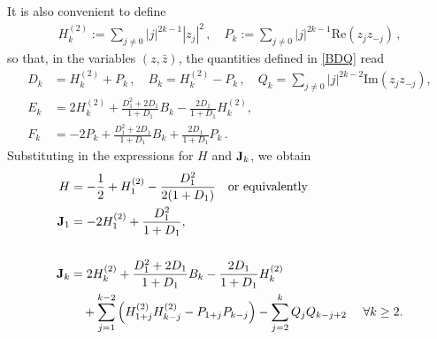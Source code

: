 \documentclass[reqno,11pt]{amsart}
\theoremstyle{plain}
\numberwithin{equation}{section}
\newcommand{\I}{{\texttt{\bf J}}}
\begin{document}
{%
It is also convenient to define
\[	\begin{aligned}
	H^{(2)}_k:= \sum_{j \neq 0} |j|^{2k-1} |z_j|^2\,,\quad P_k:= \sum_{j \neq 0} |j|^{2k-1}
	\text{Re}(z_j z_{-j})\,,
\end{aligned}
\]
so that, in the variables $(z,\bar z)$, the quantities defined in \eqref{BDQ} read
\[
\begin{aligned}
	D_k &= H^{(2)}_k + P_k\,, \quad  B_k = H^{(2)}_k - P_k\,, \quad Q_k = \sum_{j \neq 0} |j|^{2k-2} \text{Im}(z_j z_{-j}), \\
	E_k &= 2 H^{(2)}_k + \frac{D_1^2 + 2D_1}{1+D_1} B_k - \frac{2D_1}{1+D_1} H^{(2)}_k, \\
	F_k &= -2 P_k + \frac{D_1^2 + 2D_1}{1+D_1} B_k + \frac{2D_1}{1+D_1} P_k\,.
\end{aligned}
\]
Substituting in the expressions for $H$ and $\I_k$, we obtain %
\begin{equation}\label{costanticompl}
	\begin{aligned}
		H &= -\frac12 + H_1^{(2)} - \frac{D_1^2}{2(1+D_1)} \quad\text{or equivalently}\\
		\I_1&= -2H_1^{(2)} + \frac{D_1^2}{1+D_1},\\[15pt]
		\I_k &= 2H^{(2)}_k + \frac{D_1^2 + 2D_1}{1+D_1} B_k - \frac{2D_1}{1+D_1} H^{(2)}_k \\%
		&\quad + \sum_{j=1}^{k-2} \left( H^{(2)}_{1+j}H^{(2)}_{k-j} - P_{1+j}P_{k-j} \right) - \sum_{j=2}^k Q_{j}Q_{k-j+2} \quad\  \forall k\geq2.
	\end{aligned}

\end{equation}}
\end{document}
